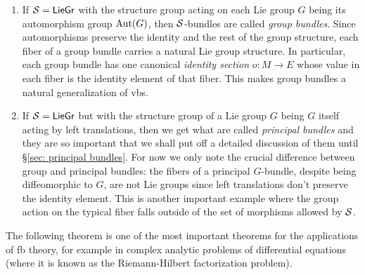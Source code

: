 \begin{example}\label{ex non-vector G-bundles}
    \begin{enumerate}
        \item If $\mathcal{S}=\mathsf{LieGr}$ with the structure group acting on each Lie group $G$ being its automorphism group $\operatorname{Aut}(G)$, then $\mathcal{S}$-bundles are called \emph{group bundles}. Since automorphisms preserve the identity and the rest of the group structure, each fiber of a group bundle carries a natural Lie group structure. In particular, each group bundle has one canonical \emph{identity section} $o:M\to E$ whose value in each fiber is the identity element of that fiber. This makes group bundles a natural generalization of \glspl{vb}. 
        
        \item If $\mathcal{S}=\mathsf{LieGr}$ but with the structure group of a Lie group $G$ being $G$ itself acting by left translations, then we get what are called \emph{principal bundles} and they are so important that we shall put off a detailed discussion of them until \S\ref{sec: principal bundles}. For now we only note the crucial difference between group and principal bundles: the fibers of a principal $G$-bundle, despite being diffeomorphic to $G$, are not Lie groups since left translations don't preserve the identity element. This is another important example where the group action on the typical fiber falls outside of the set of morphisms allowed by $\mathcal{S}$.
    \end{enumerate}
\end{example}

The following theorem is one of the most important theorems for the applications of \gls{fb} theory, for example in complex analytic problems of differential equations (where it is known as the Riemann-Hilbert factorization problem).


